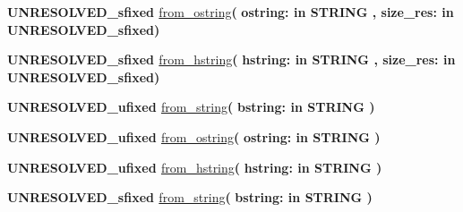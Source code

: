 \begin{DoxyCompactItemize}
\item 
{\bfseries {\bfseries \textcolor{vhdlchar}{U\+N\+R\+E\+S\+O\+L\+V\+E\+D\+\_\+sfixed}\textcolor{vhdlchar}{ }}} \hyperlink{class__fixed__pkg_ab56a504111d706bf1d60a6018c706381}{from\+\_\+ostring}{\bfseries  ( }{\bfseries \textcolor{vhdlchar}{ostring\+: }\textcolor{stringliteral}{in }{\bfseries \textcolor{comment}{S\+T\+R\+I\+N\+G}\textcolor{vhdlchar}{ }}}{\bfseries  , \textcolor{vhdlchar}{size\+\_\+res\+: }\textcolor{stringliteral}{in }\textcolor{vhdlchar}{U\+N\+R\+E\+S\+O\+L\+V\+E\+D\+\_\+sfixed}}{\bfseries  )} 
\item 
{\bfseries {\bfseries \textcolor{vhdlchar}{U\+N\+R\+E\+S\+O\+L\+V\+E\+D\+\_\+sfixed}\textcolor{vhdlchar}{ }}} \hyperlink{class__fixed__pkg_a406a5f8022635c932b98bf9a276674bf}{from\+\_\+hstring}{\bfseries  ( }{\bfseries \textcolor{vhdlchar}{hstring\+: }\textcolor{stringliteral}{in }{\bfseries \textcolor{comment}{S\+T\+R\+I\+N\+G}\textcolor{vhdlchar}{ }}}{\bfseries  , \textcolor{vhdlchar}{size\+\_\+res\+: }\textcolor{stringliteral}{in }\textcolor{vhdlchar}{U\+N\+R\+E\+S\+O\+L\+V\+E\+D\+\_\+sfixed}}{\bfseries  )} 
\item 
{\bfseries {\bfseries \textcolor{vhdlchar}{U\+N\+R\+E\+S\+O\+L\+V\+E\+D\+\_\+ufixed}\textcolor{vhdlchar}{ }}} \hyperlink{class__fixed__pkg_abb53b970a1e042806d48465a0eaf88a2}{from\+\_\+string}{\bfseries  ( }{\bfseries \textcolor{vhdlchar}{bstring\+: }\textcolor{stringliteral}{in }{\bfseries \textcolor{comment}{S\+T\+R\+I\+N\+G}\textcolor{vhdlchar}{ }}}{\bfseries  )} 
\item 
{\bfseries {\bfseries \textcolor{vhdlchar}{U\+N\+R\+E\+S\+O\+L\+V\+E\+D\+\_\+ufixed}\textcolor{vhdlchar}{ }}} \hyperlink{class__fixed__pkg_a9543fa305824b857903791a3e3f1dc8f}{from\+\_\+ostring}{\bfseries  ( }{\bfseries \textcolor{vhdlchar}{ostring\+: }\textcolor{stringliteral}{in }{\bfseries \textcolor{comment}{S\+T\+R\+I\+N\+G}\textcolor{vhdlchar}{ }}}{\bfseries  )} 
\item 
{\bfseries {\bfseries \textcolor{vhdlchar}{U\+N\+R\+E\+S\+O\+L\+V\+E\+D\+\_\+ufixed}\textcolor{vhdlchar}{ }}} \hyperlink{class__fixed__pkg_af4e65a5fd0731c7913df14fa262c75ba}{from\+\_\+hstring}{\bfseries  ( }{\bfseries \textcolor{vhdlchar}{hstring\+: }\textcolor{stringliteral}{in }{\bfseries \textcolor{comment}{S\+T\+R\+I\+N\+G}\textcolor{vhdlchar}{ }}}{\bfseries  )} 
\item 
{\bfseries {\bfseries \textcolor{vhdlchar}{U\+N\+R\+E\+S\+O\+L\+V\+E\+D\+\_\+sfixed}\textcolor{vhdlchar}{ }}} \hyperlink{class__fixed__pkg_acaa3b6971823145294d128baab33dfab}{from\+\_\+string}{\bfseries  ( }{\bfseries \textcolor{vhdlchar}{bstring\+: }\textcolor{stringliteral}{in }{\bfseries \textcolor{comment}{S\+T\+R\+I\+N\+G}\textcolor{vhdlchar}{ }}}{\bfseries  )} 

\end{DoxyCompactItemize}
